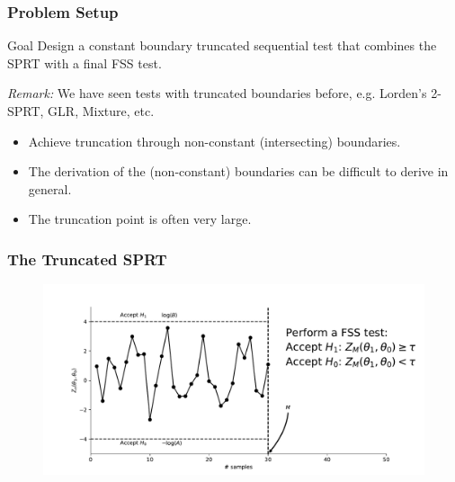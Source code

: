 \documentclass[10pt]{beamer}
\begin{document}
\begin{frame}
\frametitle{Problem Setup}

\begin{block}{Goal}
Design a constant boundary truncated sequential test that combines the SPRT with a final FSS test.
\end{block}

\textit{Remark:} We have seen tests with truncated boundaries before, e.g. Lorden's 2-SPRT, GLR, Mixture, etc.
\begin{itemize}
\item Achieve truncation through non-constant (intersecting) boundaries.
\item The derivation of the (non-constant) boundaries can be difficult to derive in general.
\item The truncation point is often very large.
\end{itemize}


\end{frame}

\begin{frame}
\frametitle{The Truncated SPRT}

\begin{figure}
\centering
\includegraphics[width=\textwidth]{images/truncated_sprt}
\end{figure}

\end{frame}
\end{document}
